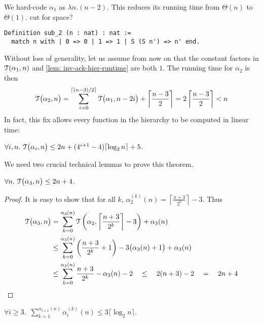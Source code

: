 We hard-code $\alpha_1$ as $\lambda n.(n-2)$. This reduces its running time 
from $\Theta(n)$ to $\Theta(1)$.
{\color{red}cut for space?}
\begin{lstlisting}
Definition sub_2 (n : nat) : nat := 
  match n with | 0 => 0 | 1 => 1 | S (S n') => n' end.
\end{lstlisting}
Without loss of generality, let us assume from now on that the constant factors in $\mathcal{T}(\alpha_1, n)$ and \cref{lem: inv-ack-hier-runtime} are both $1$. The running time for $\alpha_2$ is then
\begin{equation*}
\mathcal{T}\big(\alpha_2, n\big)
 = \sum_{i=0}^{\lceil (n-3)/2 \rceil} \mathcal{T} \big(\alpha_1, n-2i\big) + \left\lceil \frac{n-3}{2} \right\rceil =  2\left\lceil \frac{n-3}{2} \right\rceil
 < n 
\end{equation*}
In fact, this fix allows every function in the hierarchy to be computed in linear time:
\begin{thm} \label{thm: inv-ack-hier-runtime-improved}
	$\forall i, n.~ \mathcal{T}\big(\alpha_i, n\big) \le 2n + (4^{i+1} - 4)\lceil \log_2n\rceil + 5$.
\end{thm}
We need two crucial technical lemmas to prove this theorem.
\begin{lem} \label{lem: inv-ack-3-runtime}
	$\forall n.~\mathcal{T}\big(\alpha_3, n\big) \le 2n + 4$.
\end{lem}
\begin{proof}
	It is easy to show that for all $k$, $\alpha_2^{(k)}(n) = \left\lceil \frac{n+3}{2^k} \right\rceil - 3$. Thus
	\begin{equation*}
	\begin{aligned}
	\mathcal{T}\big(\alpha_3, n\big) & =
	\sum_{k=0}^{\alpha_{3}(n)}\mathcal{T}\left(\alpha_2, \left\lceil \frac{n+3}{2^k} \right\rceil - 3\right) + \alpha_{3}(n)  \\ 
	& \le \sum_{k=0}^{\alpha_3(n)}\left(\frac{n+3}{2^k} + 1\right) - 3\big(\alpha_3(n) + 1\big) + \alpha_3(n) \\
	& \le \sum_{k=0}^{\alpha_3(n)}\frac{n+3}{2^k} - \alpha_3(n) - 2 \quad \le \quad 2(n+3) - 2 \quad = \quad 2n + 4
	\end{aligned}
	\end{equation*}
\end{proof}
\begin{lem} \label{lem: sum-alpha-repeat}
	$\forall i \ge 3$.~$\displaystyle \sum_{k=1}^{\alpha_{i+1}(n)} \alpha_i^{(k)}(n) \le 3\big\lceil \log_2n \big\rceil$.
\end{lem}
